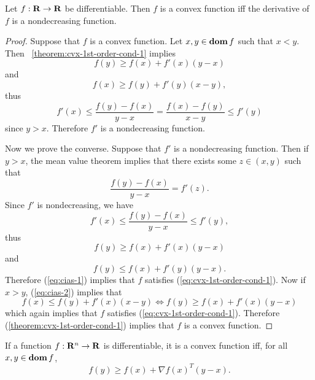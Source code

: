 \documentclass[10pt, twoside]{book}   	%
\begin{document}
\begin{corollary}
\label{corollary:cvx-deriv-non-decreasing}
Let $f:\mathbf{R}\to\mathbf{R}$ be differentiable. Then $f$ is a convex function iff the derivative of $f$ is a nondecreasing function.
\end{corollary}
\begin{proof}
Suppose that $f$ is a convex function.
Let $x,y\in\mathop{\bf dom} f$ such that $x<y$.
Then \theoremname~\ref{theorem:cvx-1st-order-cond-1} implies
\[
f(y) \geq f(x) + f'(x)(y-x)
\]
and
\[
f(x) \geq f(y) + f'(y)(x-y),
\]
thus
\[
f'(x) \leq \frac{f(y)-f(x)}{y-x}
= \frac{f(x)-f(y)}{x-y} \leq f'(y)
\]
since $y>x$.
Therefore $f'$ is a nondecreasing function.

Now we prove the converse. Suppose that $f'$ is a nondecreasing function.
Then if $y>x$, the mean value theorem implies that there exists some $z \in (x,y)$ such that
\[
\frac{f(y)-f(x)}{y-x} = f'(z).
\]
Since $f'$ is nondecreasing, we have
\[
f'(x) \leq \frac{f(y)-f(x)}{y-x} \leq f'(y),
\]
thus
\begin{equation}
\label{eq:cias-1}
f(y) \geq f(x) + f'(x)(y-x)
\end{equation}
and
\begin{equation}
\label{eq:cias-2}
f(y) \leq f(x) + f'(y)(y-x).
\end{equation}
Therefore (\ref{eq:cias-1}) implies that $f$ satisfies (\ref{eq:cvx-1st-order-cond-1}).
Now if $x>y$, (\ref{eq:cias-2}) implies that
\[
f(x) \leq f(y) + f'(x)(x-y)
\Leftrightarrow
f(y) \geq f(x) + f'(x)(y-x)
\]
which again implies that $f$ satisfies (\ref{eq:cvx-1st-order-cond-1}).
Therefore (\ref{theorem:cvx-1st-order-cond-1}) implies that $f$ is a convex function.
\end{proof}

\begin{corollary}
\label{corollary:cvx-1st-order-cond}
If a function $f:\mathbf{R}^n\to\mathbf{R}$ is differentiable, it is a convex function iff, for all $x,y \in \mathop{\bf dom} f$,
\begin{equation}
\label{eq:cvx-1st-order-cond}
        f(y) \geq f(x) + \nabla f(x)^T (y-x).
\end{equation}
\end{corollary}
\end{document}
